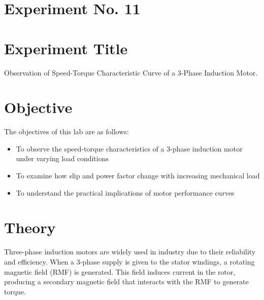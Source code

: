 \documentclass[a4paper,12pt]{article}
\begin{document}
	\section{Experiment No. 11}
	
	\section{Experiment Title}
	Observation of Speed-Torque Characteristic Curve of a 3-Phase Induction Motor.
	
	\section{Objective}
	
	The objectives of this lab are as follows:
	\begin{itemize}
		\item To observe the speed-torque characteristics of a 3-phase induction motor under varying load conditions
		\item To examine how slip and power factor change with increasing mechanical load
		\item To understand the practical implications of motor performance curves
	\end{itemize}
	
	\section*{Theory}
	
	Three-phase induction motors are widely used in industry due to their reliability and efficiency. When a 3-phase supply is given to the stator windings, a rotating magnetic field (RMF) is generated. This field induces current in the rotor, producing a secondary magnetic field that interacts with the RMF to generate torque.
	
\end{document}
